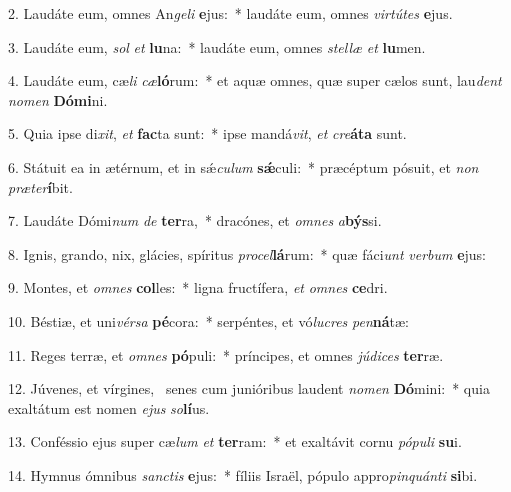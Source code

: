 2. Laudáte eum, omnes An\textit{ge}\textit{li} \textbf{e}jus:~*  laudáte eum, omnes \textit{vir}\textit{tú}\textit{tes} \textbf{e}jus.\

3. Laudáte eum, \textit{sol} \textit{et} \textbf{lu}na:~*  laudáte eum, omnes \textit{stel}\textit{læ} \textit{et} \textbf{lu}men.\

4. Laudáte eum, cæ\textit{li} \textit{cæ}\textbf{ló}rum:~*  et aquæ omnes, quæ super cælos sunt, lau\textit{dent} \textit{no}\textit{men} \textbf{Dó}\textbf{mi}ni.\

5. Quia ipse di\textit{xit}, \textit{et} \textbf{fac}ta sunt:~*  ipse mandá\textit{vit}, \textit{et} \textit{cre}\textbf{á}\textbf{ta} sunt.\

6. Státuit ea in ætérnum, et in sǽ\textit{cu}\textit{lum} \textbf{sǽ}culi:~*  præcéptum pósuit, et \textit{non} \textit{præ}\textit{ter}\textbf{í}bit.\

7. Laudáte Dómi\textit{num} \textit{de} \textbf{ter}ra,~*  dracónes, et \textit{om}\textit{nes} \textit{a}\textbf{býs}si.\

8. Ignis, grando, nix, glácies, spíritus \textit{pro}\textit{cel}\textbf{lá}rum:~*  quæ fáci\textit{unt} \textit{ver}\textit{bum} \textbf{e}jus:\

9. Montes, et \textit{om}\textit{nes} \textbf{col}les:~*  ligna fructífera, \textit{et} \textit{om}\textit{nes} \textbf{ce}dri.\

10. Béstiæ, et uni\textit{vér}\textit{sa} \textbf{pé}cora:~*  serpéntes, et vó\textit{lu}\textit{cres} \textit{pen}\textbf{ná}tæ:\

11. Reges terræ, et \textit{om}\textit{nes} \textbf{pó}puli:~*  príncipes, et omnes \textit{jú}\textit{di}\textit{ces} \textbf{ter}ræ.\

12. Júvenes, et vírgines, \dag\  senes cum junióribus laudent \textit{no}\textit{men} \textbf{Dó}mini:~*  quia exaltátum est nomen \textit{e}\textit{jus} \textit{so}\textbf{lí}us.\

13. Conféssio ejus super cæ\textit{lum} \textit{et} \textbf{ter}ram:~*  et exaltávit cornu \textit{pó}\textit{pu}\textit{li} \textbf{su}i.\

14. Hymnus ómnibus \textit{sanc}\textit{tis} \textbf{e}jus:~*  fíliis Israël, pópulo appro\textit{pin}\textit{quán}\textit{ti} \textbf{si}bi.\

